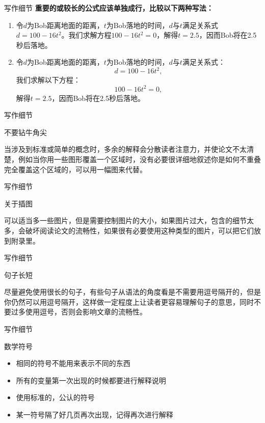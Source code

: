 \documentclass[UTF8]{ctexbeamer}
\begin{document}
\begin{frame}{写作细节}
\textbf{重要的或较长的公式应该单独成行，比较以下两种写法：}\par
\begin{enumerate}
    \item 令$d$为Bob距离地面的距离，$t$为Bob落地的时间，$d$与$t$满足关系式$d = 100 − 16t^{2}$。我们求解方程$100 − 16t^{2} = 0$，解得$t =2.5$，因而Bob将在2.5秒后落地。\par
    \item 令$d$为Bob距离地面的距离，$t$为Bob落地的时间，$d$与$t$满足关系式：
         $$d = 100 − 16t^{2},$$
         我们求解以下方程：
         $$100 − 16t^{2} =0,$$
         解得$t =2.5$，因而Bob将在2.5秒后落地。
\end{enumerate}
\end{frame}
\begin{frame}{写作细节}
    \begin{alertblock}{不要钻牛角尖}
    \end{alertblock}
    当涉及到标准或简单的概念时，多余的解释会分散读者注意力，并使论文不太清楚，例如当你用一些图形覆盖一个区域时，没有必要很详细地叙述你是如何不重叠完全覆盖这个区域的，可以用一幅图来代替。
\end{frame}

\begin{frame}{写作细节}
    \begin{alertblock}{关于插图}
    \end{alertblock}
    可以适当多一些图片，但是需要控制图片的大小，如果图片过大，包含的细节太多，会破坏阅读论文的流畅性，如果很有必要使用这种类型的图片，可以把它们放到附录里。
\end{frame}
    
\begin{frame}{写作细节}
    \begin{alertblock}{句子长短}
    \end{alertblock}
    尽量避免使用很长的句子，有些句子从语法的角度看是不需要用逗号隔开的，但是你仍然可以用逗号隔开，这样做一定程度上让读者更容易理解句子的意思，同时不要过多使用逗号，否则会影响文章的流畅性。
\end{frame}

\begin{frame}{写作细节}
\begin{alertblock}{数学符号}
\end{alertblock}
    \begin{itemize}
        \item 相同的符号不能用来表示不同的东西
        \item 所有的变量第一次出现的时候都要进行解释说明
        \item 使用标准的，公认的符号
        \item 某一符号隔了好几页再次出现，记得再次进行解释
    \end{itemize}
\end{frame}
\end{document}
